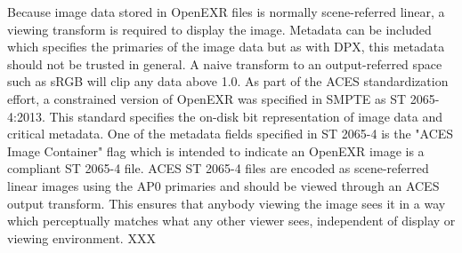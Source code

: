 Because image data stored in OpenEXR files is normally scene-referred linear, a viewing transform is required to display the image. Metadata can be included which specifies the primaries of the image data but as with DPX, this metadata should not be trusted in general. A naive transform to an output-referred space such as sRGB will clip any data above 1.0. As part of the ACES standardization effort, a constrained version of OpenEXR was specified in SMPTE as ST 2065-4:2013.  This standard specifies the on-disk bit representation of image data and critical metadata.  One of the metadata fields specified in ST 2065-4 is the "ACES Image Container" flag which is intended to indicate an OpenEXR image is a compliant ST 2065-4 file.  ACES ST 2065-4 files are encoded as scene-referred linear images using the AP0 primaries and should be viewed through an ACES output transform. This ensures that anybody viewing the image sees it in a way which perceptually matches what any other viewer sees, independent of display or viewing environment.
XXX

